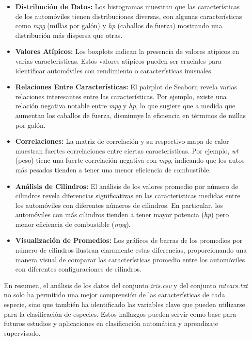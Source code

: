 \documentclass[conference]{IEEEtran}
\begin{document}
    \begin{itemize}
        \item \textbf{Distribución de Datos:} Los histogramas muestran que las características de los automóviles tienen distribuciones diversas, con algunas características como \textit{mpg} (millas por galón) y \textit{hp} (caballos de fuerza) mostrando una distribución más dispersa que otras.
        
        \item \textbf{Valores Atípicos:} Los boxplots indican la presencia de valores atípicos en varias características. Estos valores atípicos pueden ser cruciales para identificar automóviles con rendimiento o características inusuales.
        
        \item \textbf{Relaciones Entre Características:} El pairplot de Seaborn revela varias relaciones interesantes entre las características. Por ejemplo, existe una relación negativa notable entre \textit{mpg} y \textit{hp}, lo que sugiere que a medida que aumentan los caballos de fuerza, disminuye la eficiencia en términos de millas por galón.
        
        \item \textbf{Correlaciones:} La matriz de correlación y su respectivo mapa de calor muestran fuertes correlaciones entre ciertas características. Por ejemplo, \textit{wt} (peso) tiene una fuerte correlación negativa con \textit{mpg}, indicando que los autos más pesados tienden a tener una menor eficiencia de combustible.
        
        \item \textbf{Análisis de Cilindros:} El análisis de los valores promedio por número de cilindros revela diferencias significativas en las características medidas entre los automóviles con diferentes números de cilindros. En particular, los automóviles con más cilindros tienden a tener mayor potencia (\textit{hp}) pero menor eficiencia de combustible (\textit{mpg}).
        
        \item \textbf{Visualización de Promedios:} Los gráficos de barras de los promedios por número de cilindros ilustran claramente estas diferencias, proporcionando una manera visual de comparar las características promedio entre los automóviles con diferentes configuraciones de cilindros.
    
    \end{itemize}
    
    En resumen, el análisis de los datos del conjunto \textit{iris.csv} y del conjunto \textit{mtcars.txt} no solo ha permitido una mejor comprensión de las características de cada especie, sino que también ha identificado las variables clave que pueden utilizarse para la clasificación de especies. Estos hallazgos pueden servir como base para futuros estudios y aplicaciones en clasificación automática y aprendizaje supervisado.
 
\end{document}
